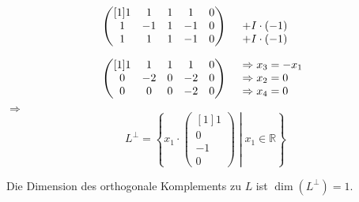 \documentclass[main.tex]{subfiles}
\begin{document}
\begin{equation*}
    \begin{array}{ r l }
    \begin{pmatrix}[1]
    1 & 1 & 1 & 1 & 0\\
    1 & -1 & 1 & -1 & 0\\
    1 & 1 & 1 & -1 & 0
    \end{pmatrix} & \begin{array}{ l }
    \\
    +I\cdotp ( -1)\\
    +I\cdotp ( -1)
    \end{array}\vspace*{4mm}\\
    \begin{pmatrix}[1]
    1 & 1 & 1 & 1 & 0\\
    0 & -2 & 0 & -2 & 0\\
    0 & 0 & 0 & -2 & 0
    \end{pmatrix} & \begin{array}{ l }
    \Rightarrow x_{3} =-x_{1}\\
    \Rightarrow x_{2} =0\\
    \Rightarrow x_{4} =0
    \end{array}
    \end{array}
\end{equation*}
$\Rightarrow $
\begin{equation*}
    L^{\perp } =\left\{x_{1} \cdotp \begin{pmatrix}[1]
    1\\
    0\\
    -1\\
    0
    \end{pmatrix}\middle| x_{1} \in \mathbb{R}\right\}
\end{equation*}

Die Dimension des orthogonale Komplements zu $L$ ist $\dim\left( L^{\perp }\right) = 1$.
\end{document}
